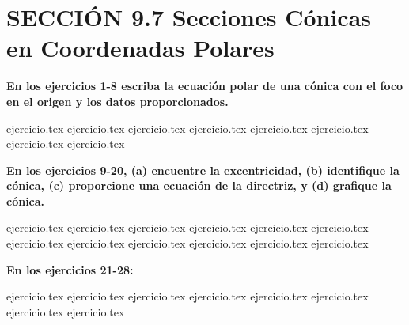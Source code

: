 
\section*{SECCIÓN 9.7 \quad Secciones Cónicas en Coordenadas Polares}

\noindent\textbf{En los ejercicios 1-8 escriba la ecuación polar de una cónica con el foco en el origen y los datos proporcionados.}
\begin{enumerate}
    \setcounter{enumi}{0}
    {ejercicio.tex}
{ejercicio.tex}
{ejercicio.tex}
{ejercicio.tex}
{ejercicio.tex}
{ejercicio.tex}
{ejercicio.tex}
{ejercicio.tex}
\end{enumerate}

\vspace{0.3cm}
\noindent\textbf{En los ejercicios 9-20, (a) encuentre la excentricidad, (b) identifique la cónica, (c) proporcione una ecuación de la directriz, y (d) grafique la cónica.}
\begin{enumerate}
    \setcounter{enumi}{8}
    {ejercicio.tex}
{ejercicio.tex}
{ejercicio.tex}
{ejercicio.tex}
{ejercicio.tex}
{ejercicio.tex}
{ejercicio.tex}
{ejercicio.tex}
{ejercicio.tex}
{ejercicio.tex}
{ejercicio.tex}
{ejercicio.tex}
\end{enumerate}

\vspace{0.3cm}
\noindent\textbf{En los ejercicios 21-28:}
\begin{enumerate}
    \setcounter{enumi}{20}
    {ejercicio.tex}
{ejercicio.tex}
{ejercicio.tex}
{ejercicio.tex}
{ejercicio.tex}
{ejercicio.tex}
{ejercicio.tex}
{ejercicio.tex}
\end{enumerate}
